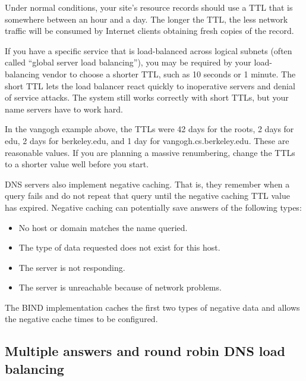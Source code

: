 Under normal conditions, your site's resource records should use a TTL
that is somewhere between an hour and a day. The longer the TTL, the
less network traffic will be consumed by Internet clients obtaining
fresh copies of the record.

If you have a specific service that is load-balanced across logical
subnets (often called ``global server load balancing''), you may be
required by your load-balancing vendor to choose a shorter TTL, such as
10 seconds or 1 minute. The short TTL lets the load balancer react
quickly to inoperative servers and
\protect\hypertarget{part0024_split_016.htmlux5cux23_idIndexMarker2042}{}{}denial
of service attacks. The system still works correctly with short TTLs,
but your name servers have to work hard.

In the vangogh example above, the TTLs were 42 days for the roots, 2
days for edu, 2 days for berkeley.edu, and 1 day for
vangogh.cs.berkeley.edu. These are reasonable values. If you are
planning a massive renumbering, change the TTLs to a shorter value well
before you start.

DNS servers also implement
\protect\hypertarget{part0024_split_016.htmlux5cux23_idIndexMarker2043}{}{}\protect\hypertarget{part0024_split_016.htmlux5cux23_idIndexMarker2044}{}{}negative
caching. That is, they remember when a query fails and do not repeat
that query until the negative caching TTL value has expired. Negative
caching can potentially save answers of the following types:

\begin{itemize}
\item
  No host or domain matches the name queried.
\item
  The type of data requested does not exist for this host.
\item
  The server is not responding.
\item
  The server is unreachable because of network problems.
\end{itemize}

The BIND implementation caches the first two types of negative data and
allows the negative cache times to be configured.

\protect\hypertarget{part0024_split_017.html}{}{}

\hypertarget{part0024_split_017.htmlux5cux23_idContainer1069}{}
\hypertarget{part0024_split_017.htmlux5cux23calibre_pb_16}{%
\subsection[Multiple answers and round robin DNS load
balancing]{\texorpdfstring{\protect\hypertarget{part0024_split_017.htmlux5cux23_idTextAnchor862}{}{}Multiple
answers and round robin DNS load
balancing}{Multiple answers and round robin DNS load balancing}}\label{part0024_split_017.htmlux5cux23calibre_pb_16}}

